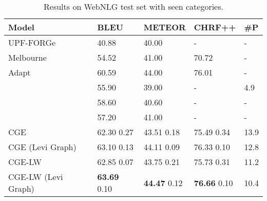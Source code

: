 \documentclass[11pt,a4paper]{article}
\begin{document}
\begin{table*}[t]
\centering
{\renewcommand{\arraystretch}{0.8}
\begin{tabular}{lllll}  
\toprule
\textbf{Model} & \textbf{BLEU} & \textbf{METEOR} & \textbf{CHRF++} &  \textbf{\#P}  \\
\midrule
 UPF-FORGe \cite{gardent-etal-2017-webnlg}   & 40.88 & 40.00 & -  & - \\
 Melbourne \cite{gardent-etal-2017-webnlg}  & 54.52 & 41.00 & 70.72 & -  \\
 Adapt \cite{gardent-etal-2017-webnlg}  & 60.59 & 44.00 & 76.01 & - \\
 \citet{marcheggiani-icnl18}   & 55.90 & 39.00 & - & 4.9 \\
  \citet{trisedya-etal-2018-gtr}   & 58.60 & 40.60 & - & - \\
 \citet{castro-ferreira-etal-2019-neural}  & 57.20 & 41.00 & -  & -\\
\midrule
 CGE & 62.30 {\small 0.27} & 43.51 {\small 0.18} & 75.49 {\small 0.34}  & 13.9 \\
 CGE (Levi Graph)  & 63.10 {\small 0.13} & 44.11 {\small 0.09} & 76.33 {\small 0.10}  & 12.8 \\
  CGE-LW & 62.85 {\small 0.07} & 43.75 {\small 0.21} & 75.73 {\small 0.31}  & 11.2 \\
 CGE-LW (Levi Graph)  & \textbf{63.69} {\small 0.10} & \textbf{44.47} {\small 0.12} & \textbf{76.66} {\small 0.10}  & 10.4 \\
\bottomrule
\end{tabular}}
\caption{Results on WebNLG test set with seen categories.}
\label{tab:webnlg_results}
\end{table*}
\end{document}
